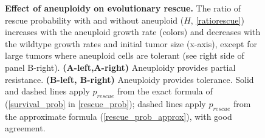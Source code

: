 \documentclass[12pt]{extarticle}
\begin{document}
\begin{figure}[p]
\begin{subfigure}{0.5\textwidth}
\end{subfigure}
\caption{\textbf{Effect of aneuploidy on evolutionary rescue.}
The ratio of rescue probability with and without aneuploid ($H$, \cref{ratiorescue}) increases with the aneuploid growth rate (colors) and decreases with the wildtype growth rates and initial tumor size (x-axis), except for large tumors where aneuploid cells are tolerant (see right side of panel B-right). 
\textbf{(A-left,A-right)} Aneuploidy provides partial resistance. \textbf{(B-left, B-right)} Aneuploidy provides tolerance.  
Solid and dashed lines apply $p_{rescue}$ from the exact formula of  (\cref{survival_prob} in \cref{rescue_prob}); %
dashed lines apply $p_{rescue}$ from the approximate formula (\cref{rescue_prob_approx}), with good agreement.
}
\label{rescue_ratio}
\end{figure}
\end{document}
